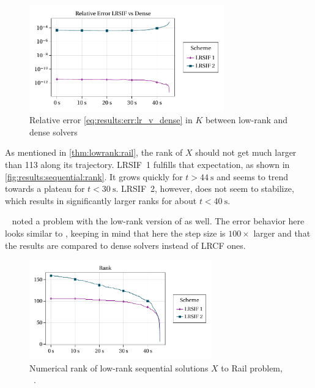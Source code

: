 \begin{figure}[tp]
  \centering
  \includegraphics[width=0.75\textwidth]{figures/fig_results_sequential_err.pdf}
  \caption[Relative error between low-rank and dense solvers]{%
    Relative error \eqref{eq:results:err:lr_v_dense} in $K$ between low-rank and dense solvers
  }
  \label{fig:results:sequential:err}
\end{figure}

As mentioned in \autoref{thm:lowrank:rail},
the rank of $X$ should not get much larger than 113 along its trajectory.
\ac{LRSIF}~1 fulfills that expectation, as shown in \autoref{fig:results:sequential:rank}.
It grows quickly for $t > \SI{44}{\second}$ and seems to trend towards a plateau for $t< \SI{30}{\second}$.
\ac{LRSIF}~2, however, does not seem to stabilize,
which results in significantly larger ranks for about $t < \SI{40}{\second}$.

\begin{remark}
  \citeauthor{Lang2015}~\cite[63]{Lang2015} noted a problem with the low-rank version of  as well.
  The error behavior here looks similar to \cite[Fig~1]{Lang2015},
  keeping in mind that here the step size is $100\times$ larger
  and that the results are compared to dense solvers instead of \ac{LRCF} ones.
\end{remark}

\begin{figure}[tp]
  \centering
  \includegraphics[width=0.7\textwidth]{figures/fig_results_sequential_rank.pdf}
  \caption[Numerical rank of low-rank sequential solutions to Rail problem]{%
    Numerical rank of low-rank sequential solutions $X$ to Rail problem,
    \cf~\cite[Figure~6.6b]{Lang2017}.
  }
  \label{fig:results:sequential:rank}
\end{figure}

